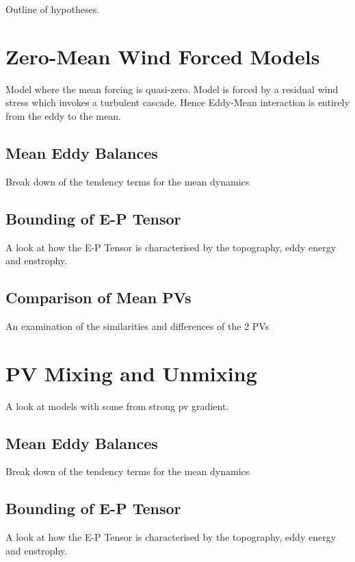 \documentclass[10pt,a4paper]{article}
\begin{document}
Outline of hypotheses.

\section{Zero-Mean Wind Forced Models}

Model where the mean forcing is quasi-zero. 
Model is forced by a residual wind stress which 
invokes a turbulent cascade. Hence Eddy-Mean
interaction is entirely from the eddy to the mean.

\subsection{Mean Eddy Balances}

Break down of the tendency terms for the mean
dynamics

\subsection{Bounding of E-P Tensor}

A look at how the E-P Tensor is characterised by
the topography, eddy energy and enstrophy.

\subsection{Comparison of Mean PVs}

An examination of the similarities and differences
of the 2 PVs

\section{PV Mixing and Unmixing}

A look at models with some from strong pv gradient.

\subsection{Mean Eddy Balances}

Break down of the tendency terms for the mean
dynamics

\subsection{Bounding of E-P Tensor}

A look at how the E-P Tensor is characterised by
the topography, eddy energy and enstrophy.
\end{document}
